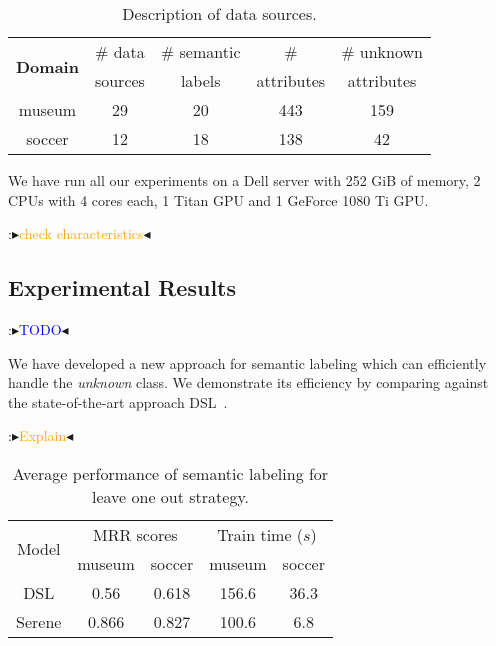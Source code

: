 \documentclass[letterpaper]{article} %
\newcommand{\authornote}[3]{
  {\fbox{\sc 
  #1}:$\blacktriangleright$\textcolor{#2}{\small{#3}}$\blacktriangleleft$}%
}
\newcommand{\ddg}[1]{\authornote{DDG}{blue}{#1}}
\newcommand{\npr}[1]{\authornote{NPR}{orange}{#1}}
\begin{document}
\begin{table}[ht]\small
  \centering
  \caption{Description of data sources.}\label{tab:data}
		\begin{tabular}{ccccc} 
		\hline
		\multirow{2}{*}{\textbf{Domain}} & \# data & \# semantic & \# & \# unknown\\
		 & sources & labels & attributes & attributes\\
		\hline
		museum & 29 & 20 & 443 & 159  \\
		soccer & 12 & 18 & 138 & 42 \\
		\hline
		\end{tabular} 
\end{table}


We have run all our experiments on a Dell server with 252 GiB of memory, 2 CPUs with 4 cores each, 1 Titan GPU and 1 GeForce 1080 Ti GPU.
\npr{check characteristics}



\subsection{Experimental Results}
\ddg{TODO}

We have developed a new approach for semantic labeling which can efficiently handle the \emph{unknown} class.
We demonstrate its efficiency by comparing against the state-of-the-art approach DSL~\cite{Pham:semantic}.
\npr{Explain}

\begin{table}[t]\small
  \centering
  \caption{Average performance of semantic labeling for leave one out strategy.}
  	\label{tab:unknownloo}
  	\begin{tabular}{c|cc|cc} 
  		\hline
  		\multirow{2}{*}{Model} & \multicolumn{2}{c|}{MRR scores} & \multicolumn{2}{c}{Train time ($s$)}\\
  		 & museum & soccer & museum & soccer\\
  		\hline
  		DSL & 0.56 & 0.618 & 156.6 & 36.3\\
 		Serene & 0.866 & 0.827 & 100.6 & 6.8\\
  		\hline
		\end{tabular} 
\end{table}
\end{document}
